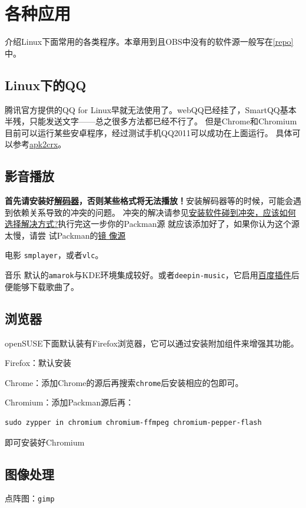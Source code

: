 \documentclass[11pt,openany]{book}
\newcommand{\soft}[1]{\texttt{\textcolor{dgreen}{#1}}}
\newcommand{\emp}[1]{\textbf{#1}}
\begin{document}
\chapter{各种应用}
介绍Linux下面常用的各类程序。本章用到且OBS中没有的软件源一般写在\ref{repo}中。
\section{Linux下的QQ}
腾讯官方提供的QQ for Linux早就无法使用了。webQQ已经挂了，SmartQQ基本半残，只能发送文字——总之很多方法都已经不行了。
但是Chrome和Chromium目前可以运行某些安卓程序，经过测试手机QQ2011可以成功在上面运行。
具体可以参考\href{http://huodong.ustc.edu.cn/Crx}{apk2crx}。
\section{影音播放}
\emp{首先请安装好\href{https://lug.ustc.edu.cn/sites/opensuse-guide/codecs.php}{解码器}，否则某些格式将无法播放！}安装解码器等的时候，可能会遇到依赖关系导致的冲突的问题。
冲突的解决请参见\href{https://forum.suse.org.cn/viewtopic.php?t=2867&p=22491#p22491}{安装软件碰到冲突，应该如何选择解决方式?}执行完这一步你的Packman源
就应该添加好了，如果你认为这个源太慢，请尝
试Packman的\href{http://packman.links2linux.org/mirrors}{镜%
像源}
\begin{compactdesc}
 \item[电影] \soft{smplayer}，或者\soft{vlc}。
 \item[音乐] 默认的\soft{amarok}与KDE环境集成较好。或者\soft{deepin-music}，它启用\href{https://forum.suse.org.cn/viewtopic.php?f=7&t=2530}{百度插件}后便能够下载歌曲了。
\end{compactdesc}
\section{浏览器}
openSUSE下面默认装有Firefox浏览器，它可以通过安装附加组件来增强其功能。

Firefox：默认安装

Chrome：添加Chrome的源后再搜索\soft{chrome}后安装相应的包即可。

Chromium：添加Packman源后再：
\begin{Verbatim}[formatcom=\color{codec}]
    sudo zypper in chromium chromium-ffmpeg chromium-pepper-flash
\end{Verbatim}
即可安装好Chromium
\section{图像处理}
点阵图：\soft{gimp}
\end{document}
